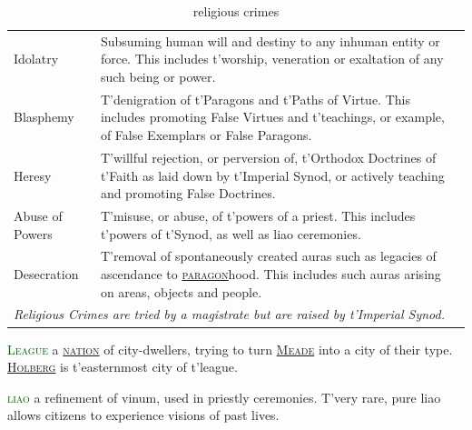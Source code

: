 \documentclass[twoside,11pt,b5paper,twocolumn]{scrbook}
\newcommand{\estcab}[1]{\textsc{\textcolor{marron}{#1}}}
\newcommand{\keyword}[1]{\textcolor{darkgreen}{#1}}
\renewcommand{\paragraph}[1]{\par\noindent\markboth{#1}{#1}\estcab{\keyword{#1}}\label{#1} }
\newcommand{\see}[1]{{\estcab{\hyperref[#1]{#1}}}}
\begin{document}
\begin{table}\begin{tabular}{p{}p{}}Idolatry& Subsuming human will and destiny to any inhuman entity or force. This includes t'worship, veneration or exaltation of any such being or power.\\ Blasphemy&T'denigration of t'Paragons and t'Paths of Virtue. This includes promoting False Virtues and t'teachings, or example, of False Exemplars or False Paragons.\\ Heresy& T'willful rejection, or perversion of, t'Orthodox Doctrines of t'Faith as laid down by t'Imperial Synod, or actively teaching and promoting False Doctrines.\\ Abuse of Powers& T'misuse, or abuse, of t'powers of a priest. This includes t'powers of t'Synod, as well as liao ceremonies.\\ Desecration& T'removal of spontaneously created auras such as legacies of ascendance to \see{paragon}hood. This includes such auras arising on areas, objects and people. \\ \multicolumn{2}{l}{\textit{Religious Crimes are tried by a magistrate but are raised by t'Imperial Synod.}}\end{tabular}\caption{religious crimes}\end{table}
\paragraph{League} a \see{nation} of city-dwellers, trying to turn \see{Meade} into a city of their type. \see{Holberg} is t'easternmost city of t'league.
\paragraph{liao} a refinement of vinum, used in priestly ceremonies. T'very rare, pure liao allows citizens to experience visions of past lives.
\end{document}

